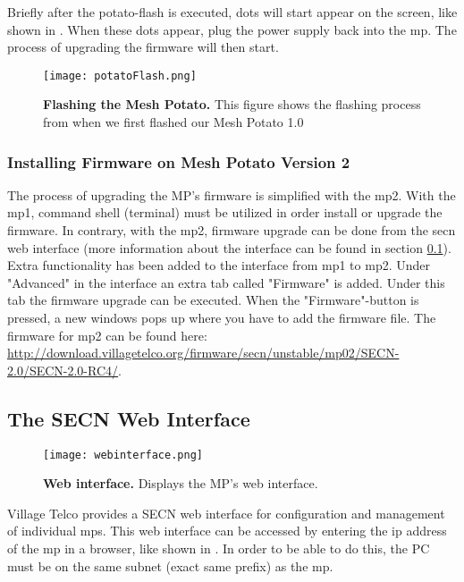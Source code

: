 Briefly after the potato-flash is executed, dots will start appear on the screen, like shown in . When these dots appear, plug the power supply back into the \gls{mp}. The process of upgrading the firmware will then start. 

\begin{figure}[b]
  \centering
      \texttt{[image: potatoFlash.png]}
  \caption [Flashing the Mesh Potato]{\textbf{Flashing the Mesh Potato.} This figure shows the flashing process from when we first flashed our Mesh Potato 1.0}
  \label{fig:flashing}
\end{figure}


\subsubsection{Installing Firmware on Mesh Potato Version 2}
The process of upgrading the MP's firmware is simplified with the \gls{mp2}. With the \gls{mp1}, command shell (terminal) must be utilized in order install or upgrade the firmware. In contrary, with the \gls{mp2}, firmware upgrade can be done from the \gls{secn} web interface (more information about the interface can be found in section \ref{subsec:interface}). Extra functionality has been added to the interface from \gls{mp1} to \gls{mp2}. Under "Advanced" in the interface an extra tab called "Firmware" is added. Under this tab the firmware upgrade can be executed. When the "Firmware"-button is pressed, a new windows pops up where you have to add the firmware file. The firmware for \gls{mp2} can be found here: \url{http://download.villagetelco.org/firmware/secn/unstable/mp02/SECN-2.0/SECN-2.0-RC4/}.

\subsection{The SECN Web Interface}
\label{subsec:interface}

\begin{figure}[t]
  \centering
      \texttt{[image: webinterface.png]}
  \caption [Web interface]{\textbf{Web interface.} Displays the MP's web interface.}
  \label{fig:webinterface}
\end{figure}

Village Telco provides a SECN web interface for configuration and management of individual \glspl{mp}. This web interface can be accessed by entering the \gls{ip} address of the \gls{mp} in a browser, like shown in . In order to be able to do this, the PC must be on the same subnet (exact same prefix) as the \gls{mp}.  

